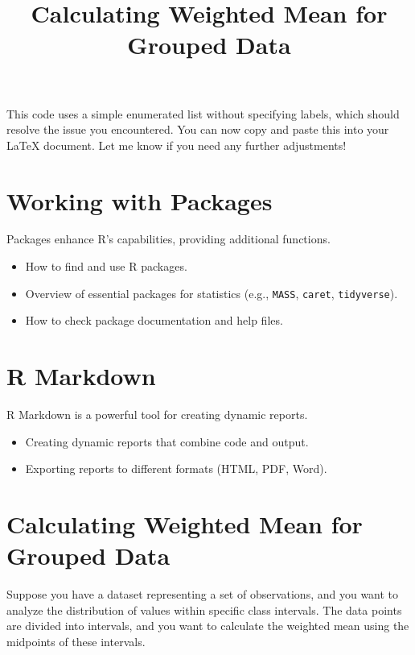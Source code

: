 \documentclass[10pt]{book}
\begin{document}
This code uses a simple enumerated list without specifying labels, which should resolve the issue you encountered. You can now copy and paste this into your LaTeX document. Let me know if you need any further adjustments!









\section{Working with Packages}
Packages enhance R's capabilities, providing additional functions.
\begin{itemize}
    \item How to find and use R packages.
    \item Overview of essential packages for statistics (e.g., \texttt{MASS}, \texttt{caret}, \texttt{tidyverse}).
    \item How to check package documentation and help files.
\end{itemize}

\section{R Markdown}
R Markdown is a powerful tool for creating dynamic reports.
\begin{itemize}
    \item Creating dynamic reports that combine code and output.
    \item Exporting reports to different formats (HTML, PDF, Word).
\end{itemize}





















\title{Calculating Weighted Mean for Grouped Data}

\section*{Calculating Weighted Mean for Grouped Data}
Suppose you have a dataset representing a set of observations, and you want to analyze the distribution of values within specific class intervals. The data points are divided into intervals, and you want to calculate the weighted mean using the midpoints of these intervals.
\end{document}
